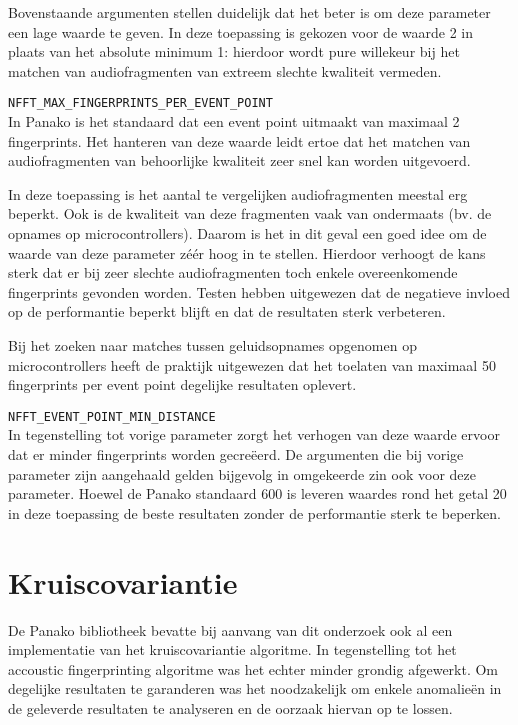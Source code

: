 \begin{description}
	Bovenstaande argumenten stellen duidelijk dat het beter is om deze parameter een lage waarde te geven. In deze toepassing is gekozen voor de waarde 2 in plaats van het absolute minimum 1: hierdoor wordt pure willekeur bij het matchen van audiofragmenten van extreem slechte kwaliteit vermeden.
	
	\item\texttt{NFFT\_MAX\_FINGERPRINTS\_PER\_EVENT\_POINT} \hfill \\
	In Panako is het standaard dat een event point uitmaakt van maximaal 2 fingerprints. Het hanteren van deze waarde leidt ertoe dat het matchen van audiofragmenten van behoorlijke kwaliteit zeer snel kan worden uitgevoerd. 
	
	In deze toepassing is het aantal te vergelijken audiofragmenten meestal erg beperkt. Ook is de kwaliteit van deze fragmenten vaak van ondermaats (bv. de opnames op microcontrollers). Daarom is het in dit geval een goed idee om de waarde van deze parameter zéér hoog in te stellen. Hierdoor verhoogt de kans sterk dat er bij zeer slechte audiofragmenten toch enkele overeenkomende fingerprints gevonden worden. Testen hebben uitgewezen dat de negatieve invloed op de performantie beperkt blijft en dat de resultaten sterk verbeteren. 
	
	Bij het zoeken naar matches tussen geluidsopnames opgenomen op microcontrollers heeft de praktijk uitgewezen dat het toelaten van maximaal 50 fingerprints per event point degelijke resultaten oplevert.
	
	\item\texttt{NFFT\_EVENT\_POINT\_MIN\_DISTANCE} \hfill \\
	In tegenstelling tot vorige parameter zorgt het verhogen van deze waarde ervoor dat er minder fingerprints worden gecreëerd. De argumenten die bij vorige parameter zijn aangehaald gelden bijgevolg in omgekeerde zin ook voor deze parameter. Hoewel de Panako standaard 600 is leveren waardes rond het getal 20 in deze toepassing de beste resultaten zonder de performantie sterk te beperken.
	
	
\end{description}


\section{Kruiscovariantie}

De Panako bibliotheek bevatte bij aanvang van dit onderzoek ook al een implementatie van het kruiscovariantie algoritme. In tegenstelling tot het accoustic fingerprinting algoritme was het echter minder grondig afgewerkt. Om degelijke resultaten te garanderen was het noodzakelijk om enkele anomalieën in de geleverde resultaten te analyseren en de oorzaak hiervan op te lossen.

